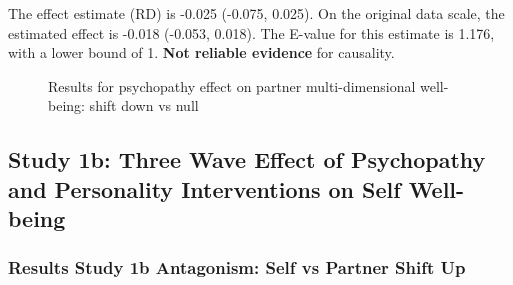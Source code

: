 \documentclass[
  singlecolumn]{article}
\begin{document}
The effect estimate (RD) is -0.025 (-0.075, 0.025). On the original data
scale, the estimated effect is -0.018 (-0.053, 0.018). The E-value for
this estimate is 1.176, with a lower bound of 1. \textbf{Not reliable
evidence} for causality.

\begin{figure}


\caption{\label{fig-results-psychopathy-partner-down}Results for
psychopathy effect on partner multi-dimensional well-being: shift down
vs null}

\end{figure}%

\newpage{}

\subsection{Study 1b: Three Wave Effect of Psychopathy and Personality
Interventions on Self
Well-being}\label{study-1b-three-wave-effect-of-psychopathy-and-personality-interventions-on-self-well-being}

\subsubsection{Results Study 1b Antagonism: Self vs Partner Shift
Up}\label{results-study-1b-antagonism-self-vs-partner-shift-up}
\end{document}

